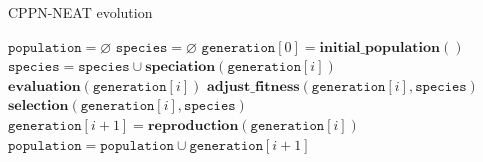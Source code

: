 \begin{algorithm}[t!]
\caption{CPPN-NEAT evolution}
\label{evolutionPseudocode}
\begin{algorithmic}[1]
\STATE $\mathtt{population} = \varnothing$
\STATE $\mathtt{species} = \varnothing$
\STATE $\mathtt{generation}[0] = \mathbf{initial\_population}()$
\STATE $\mathtt{species} = \mathtt{species} \cup \mathbf{speciation}(\mathtt{generation}[i])$
\STATE $\mathbf{evaluation}(\mathtt{generation}[i])$
\STATE $\mathbf{adjust\_fitness}(\mathtt{generation}[i], \mathtt{species})$
\STATE $\mathbf{selection}(\mathtt{generation}[i], \mathtt{species})$
\STATE $\mathtt{generation}[i+1] = \mathbf{reproduction}(\mathtt{generation}[i])$
\STATE $\mathtt{population} = \mathtt{population} \cup \mathtt{generation}[i+1]$
\ENDFOR
\end{algorithmic}
\end{algorithm}

